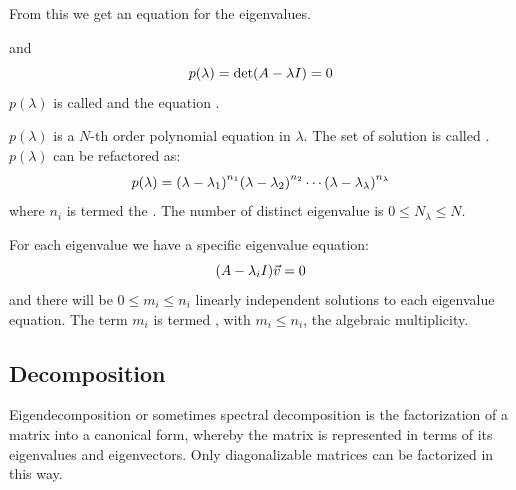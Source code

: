 From this we get an equation for the eigenvalues.
\begin{definition}{ and }
\begin{equation}
p(\lambda) = \det\br{A - \lambda I}  = 0
\end{equation}
$p(\lambda)$ is called  and the equation .
\end{definition}
$p(\lambda)$ is a $N$-th order polynomial equation in $\lambda$. The set of solution is called .  
$p(\lambda)$ can be refactored as:
\begin{equation}
p(\lambda) = \br{\lambda - \lambda_1}^{n_1} \br{\lambda - \lambda_2}^{n_2}\cdots \br{\lambda - \lambda_\lambda}^{n_\lambda}
\end{equation}
where $n_i$ is termed the . The number of distinct eigenvalue is $0\le N_\lambda\le N$.

For each eigenvalue we have a specific eigenvalue equation:
\begin{equation}
\br{A-\lambda_i I} \vec{v}= 0
\end{equation}
and there will be $0\le m_i \le n_i$ linearly independent solutions to each eigenvalue equation. The term $m_i$ is termed , with $m_i \le n_i$, the algebraic multiplicity.

\subsection{Decomposition}
Eigendecomposition or sometimes spectral decomposition is the factorization of a matrix into a canonical form, whereby the matrix is represented in terms of its eigenvalues and eigenvectors. Only diagonalizable matrices can be factorized in this way. 

